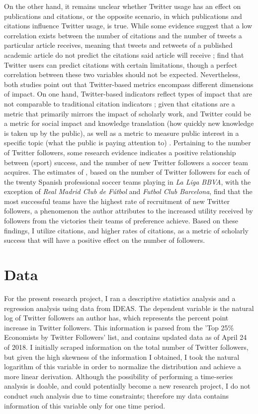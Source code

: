 \documentclass[12pt,english]{article}
\begin{document}
On the other hand, it remains unclear whether Twitter usage has an effect on publications and citations, or the opposite scenario, in which publications and citations influence Twitter usage, is true. While some evidence suggest that a low correlation exists between the number of citations and the number of tweets a particular article receives, meaning that tweets and retweets of a published academic article do not predict the citations said article will receive \citep{green}; \cite{blue} find that Twitter users can predict citations with certain limitations, though a perfect correlation between these two variables should not be expected. Nevertheless, both studies point out that Twitter-based metrics encompass different dimensions of impact. On one hand, Twitter-based indicators reflect types of impact that are not comparable to traditional citation indicators \citep{green}; given that citations are a metric that primarily mirrors the impact of scholarly work, and Twitter could be a metric for social impact and knowledge translation (how quickly new knowledge is taken up by the public), as well as a metric to measure public interest in a specific topic (what the public is paying attention to) \citep{blue}. Pertaining to the number of Twitter followers, some research evidence indicates a positive relationship between (sport) success, and the number of new Twitter followers a soccer team acquires. The estimates of \cite{levi.soccer}, based on the number of Twitter followers for each of the twenty Spanish professional soccer teams playing in \textit{La Liga BBVA}, with the exception of \textit{Real Madrid Club de Fútbol} and \textit{Futbol Club Barcelona}, find that the most successful teams have the highest rate of recruitment of new Twitter followers, a phenomenon the author attributes to the increased utility received by followers from the victories their teams of preference achieve. Based on these findings, I utilize citations, and higher rates of citations, as a metric of scholarly success that will have a positive effect on the number of followers. 


\section{Data}\label{sec:data}
For the present research project, I ran a descriptive statistics analysis and a regression analysis using data from IDEAS. The dependent variable is the natural log of Twitter followers an author has, which represents the percent point increase in Twitter followers. This information is parsed from the 'Top 25\% Economists by Twitter Followers' list, and contains updated data as of April 24 of 2018. I initially scraped information on the total number of Twitter followers, but given the high skewness of the information I obtained, I took the natural logarithm of this variable in order to normalize the distribution and achieve a more linear derivation. Although the possibility of performing a time-series analysis is doable, and could potentially become a new research project, I do not conduct such analysis due to time constraints; therefore my data contains information of this variable only for one time period. 
\end{document}
